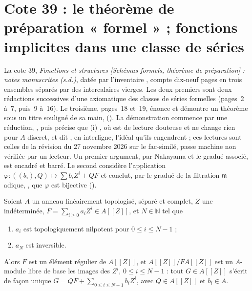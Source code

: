 \section[Cote 39 : le théorème de préparation « formel » ; fonctions implicites dans une classe de séries]{Cote 39 : le théorème de préparation « formel » ; fonctions implicites dans une classe de séries\protect{}}\label{sec:39}

La cote 39, \emph{Fonctions et structures  [Schémas formels, théorème de préparation] : notes manuscrites (s.d.)}, datée par l'inventaire \q{[vers 1960-1970]}, compte dix-neuf pages en trois ensembles séparés par des intercalaires vierges. Les deux premiers sont deux rédactions successives d'une axiomatique des classes de séries formelles (pages~2 à~7, puis~9 à~16). Le troisième, pages~18 et~19, énonce et démontre un théorème sous un titre souligné de sa main,  (). La démonstration commence par une réduction, , puis précise que (i) , où  est de lecture douteuse et ne change rien pour $A$ discret, et dit , en interligne, l'idéal qu'ils engendrent ; ces lectures sont celles de la révision du 27 novembre 2026 sur le fac-similé, passe machine non vérifiée par un lecteur. Un premier argument, par Nakayama et le gradué associé, est encadré et barré. Le second considère l'application $\varphi : ((b_i), Q) \mapsto \sum b_i Z^i + QF$ et conclut, par le gradué de la filtration $\mathfrak m$-adique, , que $\varphi$ est bijective ().

\begin{enonce}
Soient $A$ un anneau linéairement topologisé, séparé et complet, $Z$ une indéterminée, $F = \sum_{i \geqslant 0} a_i Z^i \in A[[Z]]$, et $N \in \mathbb N$ tel que
\begin{enumerate}
\item[(i)] $a_i$ est topologiquement nilpotent pour $0 \leqslant i \leqslant N - 1$ ;
\item[(ii)] $a_N$ est inversible.
\end{enumerate}
Alors $F$ est un élément régulier de $A[[Z]]$, et $A[[Z]]/F A[[Z]]$ est un $A$-module libre de base les images des $Z^i$, $0 \leqslant i \leqslant N-1$ : tout $G \in A[[Z]]$ s'écrit de façon unique $G = QF + \sum_{0 \leqslant i \leqslant N-1} b_i Z^i$, avec $Q \in A[[Z]]$ et $b_i \in A$.
\end{enonce}


